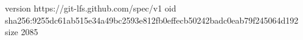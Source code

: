 version https://git-lfs.github.com/spec/v1
oid sha256:9255dc61ab515e34a49bc2593e812fb0effecb50242badc0eab79f245064d192
size 2085
